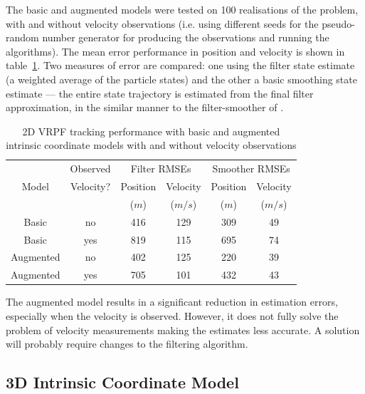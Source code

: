 \documentclass[conference]{IEEEtran}
\begin{document}
The basic and augmented models were tested on 100 realisations of the problem, with and without velocity observations (i.e. using different seeds for the pseudo-random number generator for producing the observations and running the algorithms). The mean error performance in position and velocity is shown in table~\ref{tab:2D_performance}. Two measures of error are compared: one using the filter state estimate (a weighted average of the particle states) and the other a basic smoothing state estimate --- the entire state trajectory is estimated from the final filter approximation, in the similar manner to the filter-smoother of \cite{Kitagawa1996}.
%
\begin{table}[!b]
\renewcommand{\arraystretch}{1.3}
\caption{2D VRPF tracking performance with basic and augmented intrinsic coordinate models with and without velocity observations}
\label{tab:2D_performance}
\centering
\begin{tabular}{|c|c|c|c|c|c|}
\hline
      & Observed  & \multicolumn{2}{c|}{Filter RMSEs}  & \multicolumn{2}{c|}{Smoother RMSEs}  \\
Model & Velocity? & Position & Velocity                & Position & Velocity                  \\
      &           & ($m$)    & ($m/s$)                 & ($m$)    & ($m/s$)                   \\
\hline
Basic     & no  & 416 & 129 & 309 & 49 \\
Basic     & yes & 819 & 115 & 695 & 74 \\
\hline
Augmented & no  & 402 & 125 & 220 & 39 \\
Augmented & yes & 705 & 101 & 432 & 43 \\
\hline
\end{tabular}
\end{table}
%
The augmented model results in a significant reduction in estimation errors, especially when the velocity is observed. However, it does not fully solve the problem of velocity measurements making the estimates less accurate. A solution will probably require changes to the filtering algorithm. %



\subsection{3D Intrinsic Coordinate Model}
\end{document}
